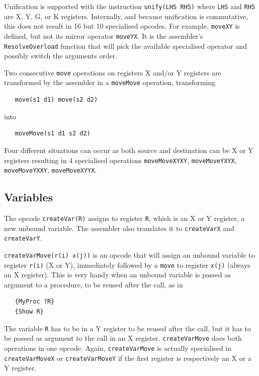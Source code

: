 \documentclass[a4paper]{memoir}
\begin{document}
Unification is supported with the instruction \lstinline!unify(LHS RHS)! where
\lstinline!LHS! and \lstinline!RHS! are  X, Y, G, or K registers.
Internally, and because unification is commutative, this does not result in 16 but 10 specialised opcodes. For example,
\lstinline!moveXY! is defined, but not its mirror operator \lstinline!moveYX!.
It is the assembler's \lstinline!ResolveOverload! function that will pick the
available specialised operator and possibly switch the arguments order.

Two consecutive \lstinline!move! operations on registers X and/or Y registers are transformed by the assembler in
a \lstinline!moveMove! operation, transforming 
\begin{lstlisting}
   move(s1 d1) move(s2 d2)
\end{lstlisting}
 into
 \begin{lstlisting}
   moveMove(s1 d1 s2 d2)
 \end{lstlisting}

Four different situations can occur as both
source and destination can be X or Y registers resulting in 4
specialised operations \lstinline!moveMoveXYXY!, \lstinline!moveMoveYXYX!, \lstinline!moveMoveYXXY!,
\lstinline!moveMoveXYYX!.


\subsection{Variables}\label{sec:opcode:variables}
The opcode \lstinline!createVar(R)! assigns to register \lstinline!R!, which is
an X or Y register, a new unbound variable. The assembler also translates it to
\lstinline!createVarX! and \lstinline!createVarY!.

\lstinline!createVarMove(r(i) x(j))! is an opcode that will assign an unbound variable to
register \lstinline!r(i)! (X or Y), immediately followed by a
\lstinline!move! to register \lstinline!x(j)! (always an X register). This is very
handy when an unbound variable is passed as argument to a procedure, to be
reused after the call, as in

\begin{lstlisting}
   {MyProc ?R}
   {Show R}
\end{lstlisting}

The variable \lstinline!R! has to be in a Y register to be reused after the
call, but it has to be passed as argument to the call in an X register.
\lstinline!createVarMove! does both operations in one opcode.
Again, \lstinline!createVarMove! is actually specialised in
\lstinline!createVarMoveX! or \lstinline!createVarMoveY! if the first register is respectively an X or a Y register.
\end{document}
